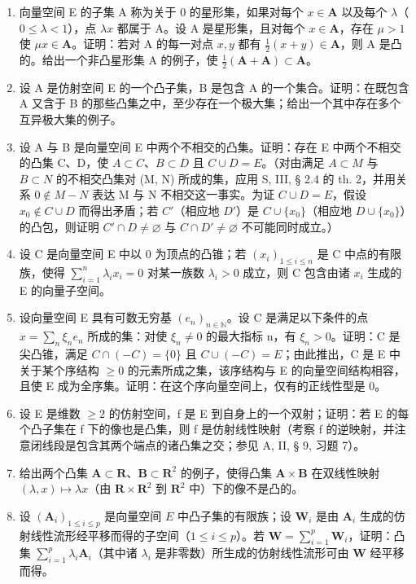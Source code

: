 \setcounter{exercisegroup}{1}
\exercisegroup

\begin{enumerate}
\def\labelenumi{\arabic{enumi})}
\item
  向量空间 E 的子集 A 称为关于 0 的星形集，如果对每个 \(x \in \mathbf{A}\) 以及每个 \(\lambda\)（\(0 \leqslant \lambda < 1\)），点 \(\lambda x\) 都属于 A。设 A 是星形集，且对每个 \(x \in \mathbf{A}\)，存在 \(\mu > 1\) 使 \(\mu x \in \mathbf{A}\)。证明：若对 A 的每一对点 \(x, y\) 都有 \(\frac{1}{2}(x + y) \in \mathbf{A}\)，则 A 是凸的。给出一个非凸星形集 A 的例子，使 \(\frac{1}{2}(\mathbf{A} + \mathbf{A}) \subset \mathbf{A}\)。
\item
  设 A 是仿射空间 E 的一个凸子集，B 是包含 A 的一个集合。证明：在既包含 A 又含于 B 的那些凸集之中，至少存在一个极大集；给出一个其中存在多个互异极大集的例子。
\item
  设 A 与 B 是向量空间 E 中两个不相交的凸集。证明：存在 E 中两个不相交的凸集 C、D，使 \(A \subset C\)、\(B \subset D\) 且 \(C \cup D = E\)。（对由满足 \(A \subset M\) 与 \(B \subset N\) 的不相交凸集对 (M, N) 所成的集，应用 S, III, § 2.4 的 th. 2，并用关系 \(0 \notin M - N\) 表达 M 与 N 不相交这一事实。为证 \(C \cup D = E\)，假设 \(x_{0} \notin C \cup D\) 而得出矛盾；若 \(C'\)（相应地 \(D'\)）是 \(C \cup \{x_{0}\}\)（相应地 \(D \cup \{x_{0}\}\)）的凸包，则证明 \(C' \cap D \neq \varnothing\) 与 \(C \cap D' \neq \varnothing\) 不可能同时成立。）
\item
  设 C 是向量空间 E 中以 0 为顶点的凸锥；若 \((x_{i})_{1\leqslant i\leqslant n}\) 是 C 中点的有限族，使得 \(\sum_{i = 1}^{n}\lambda_{i}x_{i} = 0\) 对某一族数 \(\lambda_{i} > 0\) 成立，则 C 包含由诸 \(x_{i}\) 生成的 E 的向量子空间。
\item
  设向量空间 E 具有可数无穷基 \((e_{n})_{n\in\mathbb{N}}\)。设 C 是满足以下条件的点 \(x = \sum_{n} \xi_{n} e_{n}\) 所成的集：对使 \(\xi_{n} \neq 0\) 的最大指标 n，有 \(\xi_{n} > 0\)。证明：C 是尖凸锥，满足 \(C \cap (-C) = \{0\}\) 且 \(C \cup (-C) = E\)；由此推出，C 是 E 中关于某个序结构 \(\geqslant 0\) 的元素所成之集，该序结构与 E 的向量空间结构相容，且使 E 成为全序集。证明：在这个序向量空间上，仅有的正线性型是 0。
\item
  设 E 是维数 \(\geqslant 2\) 的仿射空间，f 是 E 到自身上的一个双射；证明：若 E 的每个凸子集在 f 下的像也是凸集，则 f 是仿射线性映射（考察 f 的逆映射，并注意闭线段是包含其两个端点的诸凸集之交；参见 A, II, § 9, 习题 7）。
\item
  给出两个凸集 \(\mathbf{A} \subset \mathbf{R}\)、\(\mathbf{B} \subset \mathbf{R}^2\) 的例子，使得凸集 \(\mathbf{A} \times \mathbf{B}\) 在双线性映射 \((\lambda, x) \mapsto \lambda x\)（由 \(\mathbf{R} \times \mathbf{R}^2\) 到 \(\mathbf{R}^2\) 中）下的像不是凸的。
\item
  设 \((\mathbf{A}_i)_{1 \leqslant i \leqslant p}\) 是向量空间 \(E\) 中凸子集的有限族；设 \(\mathbf{W}_i\) 是由 \(\mathbf{A}_i\) 生成的仿射线性流形经平移而得的子空间（\(1 \leqslant i \leqslant p\)）。若 \(\mathbf{W} = \sum_{i=1}^{p} \mathbf{W}_i\)，证明：凸集 \(\sum_{i=1}^{p} \lambda_i \mathbf{A}_i\)（其中诸 \(\lambda_i\) 是非零数）所生成的仿射线性流形可由 \(\mathbf{W}\) 经平移而得。
\end{enumerate}

